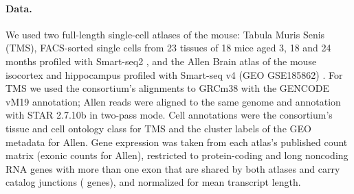 
\paragraph{Data.}
We used two full-length single-cell atlases of the mouse: Tabula Muris Senis (TMS), FACS-sorted single cells from 23
tissues of 18 mice aged 3, 18 and 24 months profiled with Smart-seq2 \cite{Tabula_Muris_Consortium2020-ga}, and the Allen
Brain atlas of the mouse isocortex and hippocampus profiled with Smart-seq v4 (GEO GSE185862) \cite{mouse-allen-brain-ssv4}.
For TMS we used the consortium's alignments to GRCm38 with the GENCODE vM19 annotation; Allen reads were aligned to the
same genome and annotation with STAR 2.7.10b in two-pass mode. Cell annotations were the consortium's tissue and cell
ontology class for TMS and the cluster labels of the GEO metadata for Allen. Gene expression was taken from each atlas's
published count matrix (exonic counts for Allen), restricted to protein-coding and long noncoding RNA genes with more than
one exon that are shared by both atlases and carry catalog junctions (\CatalogGenesMouse{} genes), and normalized for mean
transcript length.

